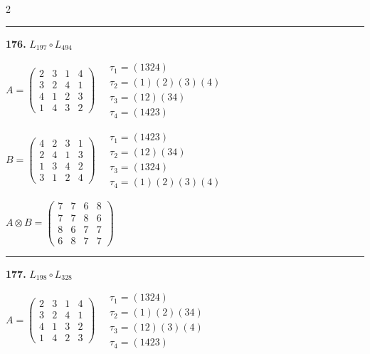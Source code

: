 \begin{multicols}{2}
\vspace{0.3em}
\hrule
\vspace{0.3em}

\noindent\textbf{176.} $L_{197} \circ L_{494}$

$A = \begin{pmatrix} 2 & 3 & 1 & 4 \\ 3 & 2 & 4 & 1 \\ 4 & 1 & 2 & 3 \\ 1 & 4 & 3 & 2 \end{pmatrix} \quad \begin{matrix} \tau_{1}=(1 3 2 4) \\ \tau_{2}=(1)(2)(3)(4) \\ \tau_{3}=(1 2)(3 4) \\ \tau_{4}=(1 4 2 3) \end{matrix}$

$B = \begin{pmatrix} 4 & 2 & 3 & 1 \\ 2 & 4 & 1 & 3 \\ 1 & 3 & 4 & 2 \\ 3 & 1 & 2 & 4 \end{pmatrix} \quad \begin{matrix} \tau_{1}=(1 4 2 3) \\ \tau_{2}=(1 2)(3 4) \\ \tau_{3}=(1 3 2 4) \\ \tau_{4}=(1)(2)(3)(4) \end{matrix}$

$A \otimes B = \begin{pmatrix} 7 & 7 & 6 & 8 \\ 7 & 7 & 8 & 6 \\ 8 & 6 & 7 & 7 \\ 6 & 8 & 7 & 7 \end{pmatrix}$

\vspace{0.3em}
\hrule
\vspace{0.3em}

\noindent\textbf{177.} $L_{198} \circ L_{328}$

$A = \begin{pmatrix} 2 & 3 & 1 & 4 \\ 3 & 2 & 4 & 1 \\ 4 & 1 & 3 & 2 \\ 1 & 4 & 2 & 3 \end{pmatrix} \quad \begin{matrix} \tau_{1}=(1 3 2 4) \\ \tau_{2}=(1)(2)(3 4) \\ \tau_{3}=(1 2)(3)(4) \\ \tau_{4}=(1 4 2 3) \end{matrix}$


\end{multicols}
